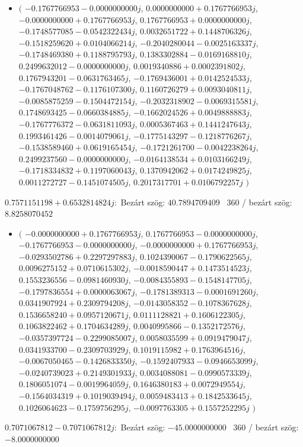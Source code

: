 \documentclass[14pt,a4paper]{article}
\begin{document}
\begin{itemize}
\item
$\big($
$-0.1767766953-0.0000000000j$, $0.0000000000+0.1767766953j$, $-0.0000000000+0.1767766953j$, $0.1767766953+0.0000000000j$, $-0.1748577085-0.0542322434j$, $0.0032651722+0.1448706326j$, $-0.1518259620+0.0104066214j$, $-0.2040280044-0.0025163337j$, $-0.1748469380+0.1188795793j$, $0.1383302884-0.0169168810j$, $0.2499632012-0.0000000000j$, $0.0019340886+0.0002391802j$, $0.1767943201-0.0631763465j$, $-0.1769436001+0.0142524533j$, $-0.1767048762-0.1176107300j$, $0.1160726279+0.0093040811j$, $-0.0085875259-0.1504472154j$, $-0.2032318902-0.0069315581j$, $0.1748693425-0.0660384885j$, $-0.1662024526+0.0049888883j$, $-0.1767776372-0.0631811093j$, $0.0005367463+0.1441247643j$, $0.1993461426-0.0014079061j$, $-0.1775143297-0.1218776267j$, $-0.1538589460+0.0619165454j$, $-0.1721261700-0.0042238264j$, $0.2499237560-0.0000000000j$, $-0.0164138534+0.0103166249j$, $-0.1718334832+0.1197060043j$, $0.1370942062+0.0174249825j$, $0.0011272727-0.1451074505j$, $0.2017317701+0.0106792257j$
$\big)$
\end{itemize}
$0.7571151198+0.6532814824j$:\
Bezárt szög: $40.7894709409$ \
360 / bezárt szög: $8.8258070452$\
\begin{itemize}
\item
$\big($
$-0.0000000000+0.1767766953j$, $0.1767766953-0.0000000000j$, $-0.1767766953-0.0000000000j$, $-0.0000000000+0.1767766953j$, $-0.0293502786+0.2297297883j$, $0.1024390067-0.1790622565j$, $0.0096275152+0.0710615302j$, $-0.0018590447+0.1473514523j$, $0.1553236556-0.0981460930j$, $-0.0084355893-0.1548147705j$, $-0.1797836554+0.0000063067j$, $-0.1781389313-0.0001691260j$, $0.0341907924+0.2309794208j$, $-0.0143058352-0.1078367628j$, $0.1536658240+0.0957120671j$, $0.0111128821+0.1606122305j$, $0.1063822462+0.1704634289j$, $0.0040995866-0.1352172576j$, $-0.0357397724-0.2299085007j$, $0.0058035599+0.0919479047j$, $0.0341933700-0.2309703929j$, $0.1019115982+0.1763964516j$, $-0.0067050465-0.1426833350j$, $-0.1592407933-0.0946653099j$, $-0.0240739023+0.2149301933j$, $0.0034088081-0.0990573339j$, $0.1806051074-0.0019964059j$, $0.1646380183+0.0072949554j$, $-0.1564034319+0.1019039494j$, $0.0059483413+0.1842533645j$, $0.1026064623-0.1759756295j$, $-0.0097763305+0.1557252295j$
$\big)$
\end{itemize}
$0.7071067812-0.7071067812j$:\
Bezárt szög: $-45.0000000000$ \
360 / bezárt szög: $-8.0000000000$\
\end{document}
